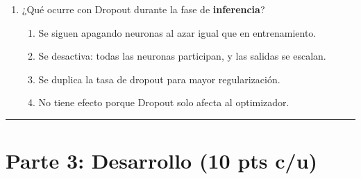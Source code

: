 \documentclass[12pt,a4paper]{article}
\begin{document}
\begin{enumerate}[label=\arabic*)]
    \item ¿Qué ocurre con Dropout durante la fase de \textbf{inferencia}?
    \begin{enumerate}[label=\Alph*)]
        \item Se siguen apagando neuronas al azar igual que en entrenamiento.
        \item Se desactiva: todas las neuronas participan, y las salidas se escalan.
        \item Se duplica la tasa de dropout para mayor regularización.
        \item No tiene efecto porque Dropout solo afecta al optimizador.
    \end{enumerate}
\end{enumerate}

\vspace{0.5cm}
\hrule
\vspace{0.5cm}

\section*{Parte 3: Desarrollo (10 pts c/u)}
\end{document}
